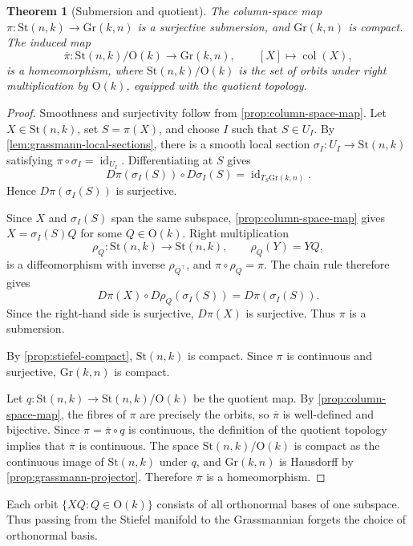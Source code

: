 \documentclass[12pt]{article}
\theoremstyle{definition}
\theoremstyle{plain}
\newtheorem{theorem}[definition]{Theorem}
\theoremstyle{remark}
\newcommand{\St}{\mathrm{St} (n,k)}
\newcommand{\Gr}{\mathrm{Gr} (k,n)}
\newcommand{\Orth}{\mathrm{O}}               %
\DeclareMathOperator{\col}{col}              %
\DeclareMathOperator{\id}{id}                %
\begin{document}
\begin{theorem}[Submersion and quotient]\label{thm:grassmann-quotient}
  The column-space map \( \pi : \St \longrightarrow \Gr \) is a surjective submersion, and \( \Gr \) is compact.
  The induced map
  \[
    \overline{\pi} : \St/\Orth(k) \longrightarrow \Gr, \qquad [X]\longmapsto\col(X),
  \]
  is a homeomorphism, where \( \St/\Orth(k) \) is the set of orbits under right multiplication by \( \Orth(k) \), equipped with the quotient topology.
\end{theorem}

\begin{proof}
  Smoothness and surjectivity follow from \cref{prop:column-space-map}.
  Let \( X\in\St \), set \( S=\pi(X) \), and choose \( I \) such that \( S\in U_I \).
  By \cref{lem:grassmann-local-sections}, there is a smooth local section \( \sigma_I : U_I\longrightarrow\St \) satisfying \( \pi\circ\sigma_I=\id_{U_I} \).
  Differentiating at \( S \) gives
  \[
    D\pi(\sigma_I(S))\circ D\sigma_I(S)=\id_{T_S\Gr}.
  \]
  Hence \( D\pi(\sigma_I(S)) \) is surjective.

  Since \( X \) and \( \sigma_I(S) \) span the same subspace, \cref{prop:column-space-map} gives \( X=\sigma_I(S)Q \) for some \( Q\in\Orth(k) \).
  Right multiplication
  \[
    \rho_Q : \St\longrightarrow\St, \qquad \rho_Q(Y)=YQ,
  \]
  is a diffeomorphism with inverse \( \rho_{Q^\top} \), and \( \pi\circ\rho_Q=\pi \).
  The chain rule therefore gives
  \[
    D\pi(X)\circ D\rho_Q(\sigma_I(S))=D\pi(\sigma_I(S)).
  \]
  Since the right-hand side is surjective, \( D\pi(X) \) is surjective.
  Thus \( \pi \) is a submersion.

  By \cref{prop:stiefel-compact}, \( \St \) is compact.
  Since \( \pi \) is continuous and surjective, \( \Gr \) is compact.

  Let \( q : \St\longrightarrow\St/\Orth(k) \) be the quotient map.
  By \cref{prop:column-space-map}, the fibres of \( \pi \) are precisely the orbits, so \( \overline{\pi} \) is well-defined and bijective.
  Since \( \pi=\overline{\pi}\circ q \) is continuous, the definition of the quotient topology implies that \( \overline{\pi} \) is continuous.
  The space \( \St/\Orth(k) \) is compact as the continuous image of \( \St \) under \( q \), and \( \Gr \) is Hausdorff by \cref{prop:grassmann-projector}.
  Therefore \( \overline{\pi} \) is a homeomorphism.
\end{proof}

Each orbit \( \{XQ:Q\in\Orth(k)\} \) consists of all orthonormal bases of one subspace.
Thus passing from the Stiefel manifold to the Grassmannian forgets the choice of orthonormal basis.
\end{document}
